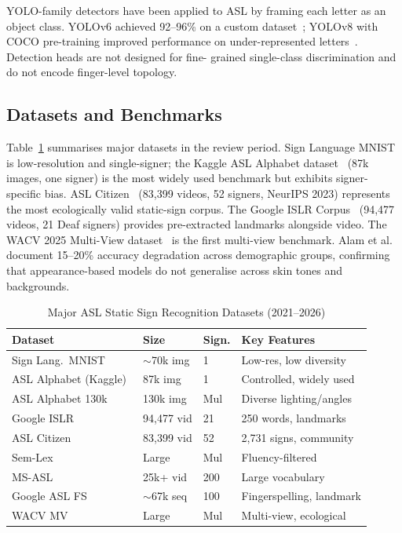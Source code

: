 \documentclass[conference]{IEEEtran}
\begin{document}
YOLO-family detectors have been applied to ASL by framing each letter as an
object class. YOLOv6 achieved 92--96\% on a custom dataset~\cite{gangal2024};
YOLOv8 with COCO pre-training improved performance on under-represented
letters~\cite{yolov8transfer2024}. Detection heads are not designed for fine-
grained single-class discrimination and do not encode finger-level topology.

\subsection{Datasets and Benchmarks}

Table~\ref{tab:datasets} summarises major datasets in the review period.
Sign Language MNIST~\cite{mnist} is low-resolution and single-signer; the
Kaggle ASL Alphabet dataset~\cite{aslkaggle} (87k images, one signer) is the
most widely used benchmark but exhibits signer-specific bias. ASL Citizen~\cite{desai2023}
(83,399 videos, 52 signers, NeurIPS 2023) represents the most ecologically
valid static-sign corpus. The Google ISLR Corpus~\cite{googleislr} (94,477
videos, 21 Deaf signers) provides pre-extracted landmarks alongside video. The
WACV 2025 Multi-View dataset~\cite{dinh2025} is the first multi-view benchmark.
Alam et al.~\cite{alam2024} document 15--20\% accuracy degradation across
demographic groups, confirming that appearance-based models do not generalise
across skin tones and backgrounds.

\begin{table}[htbp]
\caption{Major ASL Static Sign Recognition Datasets (2021--2026)}
\label{tab:datasets}
\centering
\renewcommand{\arraystretch}{1.15}
\begin{tabular}{p{2.0cm} p{1.1cm} p{0.75cm} p{3.2cm}}
\toprule
\textbf{Dataset} & \textbf{Size} & \textbf{Sign.} & \textbf{Key Features} \\
\midrule
Sign Lang.\ MNIST~\cite{mnist}         & $\sim$70k img & 1   & Low-res, low diversity \\
ASL Alphabet (Kaggle)~\cite{aslkaggle} & 87k img       & 1   & Controlled, widely used \\
ASL Alphabet 130k~\cite{asl130k}       & 130k img      & Mul & Diverse lighting/angles \\
Google ISLR~\cite{googleislr}          & 94,477 vid    & 21  & 250 words, landmarks \\
ASL Citizen~\cite{desai2023}           & 83,399 vid    & 52  & 2,731 signs, community \\
Sem-Lex~\cite{kezar2023}               & Large         & Mul & Fluency-filtered \\
MS-ASL~\cite{joze2019}                 & 25k+ vid      & 200 & Large vocabulary \\
Google ASL FS~\cite{googleaslfs}       & $\sim$67k seq & 100 & Fingerspelling, landmark \\
WACV MV~\cite{dinh2025}               & Large         & Mul & Multi-view, ecological \\
\bottomrule
\end{tabular}
\end{table}
\end{document}
